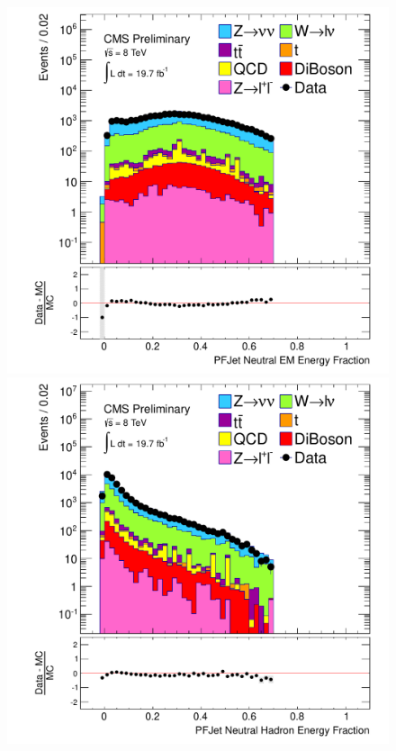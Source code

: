\begin{figure}[!Hhtb]
\begin{center}
  \includegraphics[scale=0.31]     {Figures/sus13009/nocut/prelimLabels/cut/PFAK5JetNeuEmEngFrac.pdf}
  \includegraphics[scale=0.31]     {Figures/sus13009/nocut/prelimLabels/cut/PFAK5JetNeuHadEngFrac.pdf}

\end{center}
\end{figure}
